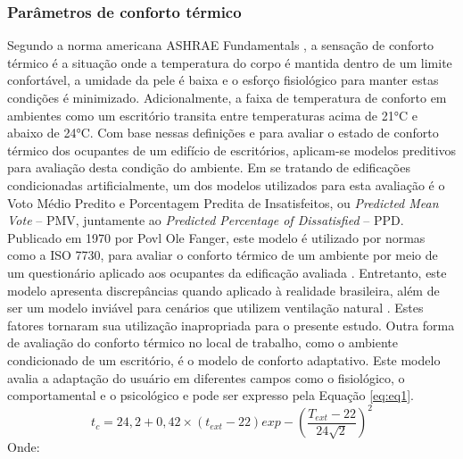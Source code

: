 \subsubsection{Parâmetros de conforto térmico}
Segundo a norma americana ASHRAE Fundamentals \citeyear{AmericanSocietyofHeatingRefrigeratingandAir-ConditioningEngineers-ASHRAE2017}, a sensação de conforto térmico é a situação onde a temperatura do corpo é mantida dentro de um limite confortável, a umidade da pele é baixa e o esforço fisiológico para manter estas condições é minimizado. Adicionalmente, a faixa de temperatura de conforto em ambientes como um escritório transita entre temperaturas acima de 21°C e abaixo de 24°C. Com base nessas definições e para avaliar o estado de conforto térmico dos ocupantes de um edifício de escritórios, aplicam-se modelos preditivos para avaliação desta condição do ambiente.\vspace*{0.3cm} \newline
Em se tratando de edificações condicionadas artificialmente, um dos modelos utilizados para esta avaliação é o Voto Médio Predito e Porcentagem Predita de Insatisfeitos, ou \textit{Predicted Mean Vote} – PMV, juntamente ao \textit{Predicted Percentage of Dissatisfied} – PPD.\vspace*{0.3cm} \newline
Publicado em 1970 por Povl Ole Fanger, este modelo é utilizado por normas como a ISO 7730, para avaliar o conforto térmico de um ambiente por meio de um questionário aplicado aos ocupantes da edificação avaliada \cite{AmericanSocietyofHeatingRefrigeratingandAir-ConditioningEngineers-ASHRAE2017}. Entretanto, este modelo apresenta discrepâncias quando aplicado à realidade brasileira, além de ser um modelo inviável para cenários que utilizem ventilação natural \cite{Rupp2016}. Estes fatores tornaram sua utilização inapropriada para o presente estudo. Outra forma de avaliação do conforto térmico no local de trabalho, como o ambiente condicionado de um escritório, é o modelo de conforto adaptativo. Este modelo avalia a adaptação do usuário em diferentes campos como o fisiológico, o comportamental e o psicológico \cite{AmericanSocietyofHeatingRefrigeratingandAir-ConditioningEngineers-ASHRAE2017a} e pode ser expresso pela Equação \ref{eq:eq1}.
\begin{equation}\label{eq:eq1}
            t_{c}=24,2+0,42\times(t_{ext}-22)exp-\left(\frac{T_{ext}-22}{24\sqrt{2}}\right)^2
\end{equation} \vspace{-0.25cm}
Onde:\par \vspace{-0.25cm}
